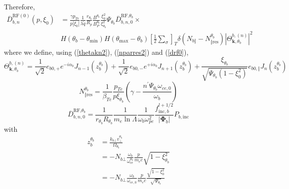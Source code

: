 Therefore,
\begin{align}
\overline{D}_{b,n}^{\text{RF}(0)}(p,\xi_{0}) &  =\frac{\gamma p_{Te}}{p\left|
\xi_{0}\right|  }\frac{1}{\lambda\widetilde{q}}\frac{r_{\theta_{b}}}{R_{p}%
}\frac{B^{\theta_{b}}}{B_{P}^{\theta_{b}}}\frac{\xi_{0}^{2}}{\xi_{\theta_{b}%
}^{2}}\Psi_{\theta_{b}}\overline{D}_{b,n,0}^{\text{RF,}\theta_{b}}%
\times\nonumber\\
&  H\left(  \theta_{b}-\theta_{\min}\right)  H\left(  \theta_{\max}-\theta
_{b}\right)  \left[  \frac{1}{2}\sum\limits_{\sigma}\right]  _{T}\delta\left(
N_{b\Vert}-N_{\Vert\text{res}}^{\theta_{b}}\right)  \left|  \Theta
_{\mathbf{k,}\theta_{b}}^{b,\left(  n\right)  }\right|  ^{2}\label{dbnb}%
\end{align}
where we define, using (\ref{thetakn2}), (\ref{nparres2}) and (\ref{drf0}),%
\begin{equation}
\Theta_{\mathbf{k,}\theta_{b}}^{b,\left(  n\right)  }=\frac{1}{\sqrt{2}%
}e_{b0,+}e^{-i\alpha_{b}}J_{n-1}\left(  z_{b}^{\theta_{b}}\right)  +\frac
{1}{\sqrt{2}}e_{b0,-}e^{+i\alpha_{b}}J_{n+1}\left(  z_{b}^{\theta_{b}}\right)
+\frac{\xi_{\theta_{b}}}{\sqrt{\Psi_{\theta_{b}}\left(  1-\xi_{0}^{2}\right)
}}e_{b0,\Vert}J_{n}\left(  z_{b}^{\theta_{b}}\right)  \label{thetakn3}%
\end{equation}%
\begin{equation}
N_{\Vert\text{res}}^{\theta_{b}}=\frac{1}{\beta_{Te}}\frac{p_{Te}}%
{p\xi_{\theta_{b}}}\left(  \gamma-\frac{n^{\prime}\Psi_{\theta_{b}}%
\omega_{ce,0}}{\omega_{b}}\right)
\end{equation}%
\begin{equation}
\overline{D}_{b,n,0}^{\text{RF,}\theta_{b}}=\frac{1}{r_{\theta_{b}}%
R_{\theta_{b}}}\frac{1}{m_{e}\ln\Lambda}\frac{1}{\omega_{b}\omega_{pe}^{2}%
}\frac{f_{\text{inc},b}^{l+1/2}}{\left|  \mathbf{\Phi}_{b}\right|
}P_{b,\text{inc}}%
\end{equation}
with
\begin{align}
z_{b}^{\theta_{b}} &  =\frac{k_{b\bot}v_{\bot}^{\theta_{b}}}{\Omega
_{\theta_{b}}}\nonumber\\
&  =-N_{b\bot}\frac{\omega_{b}}{\omega_{ce}^{\theta_{b}}}\frac{p}{m_{e}c}%
\sqrt{1-\xi_{\theta_{b}}^{2}}\nonumber\\
&  =-N_{b\bot}\frac{\omega_{b}}{\omega_{ce,0}}\frac{p}{m_{e}c}\frac
{\sqrt{1-\xi_{0}^{2}}}{\sqrt{\Psi_{\theta_{b}}}}\label{zb2}%
\end{align}
